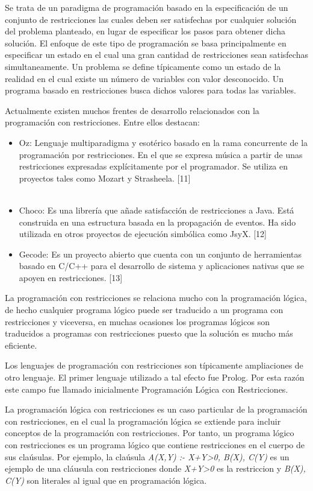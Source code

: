 Se trata de un paradigma de programaci\'on basado en la especificaci\'on de un conjunto de restricciones las cuales deben ser satisfechas por cualquier soluci\'on del problema planteado, en lugar de especificar los pasos para obtener dicha soluci\'on. El enfoque de este tipo de programaci\'on se basa principalmente en especificar un estado en el cual una gran cantidad de restricciones sean satisfechas simultaneamente. Un problema se define t\'ipicamente como un estado de la realidad	en el cual existe un n\'umero de variables con valor desconocido. Un programa basado en restricciones busca dichos valores para todas las variables.

Actualmente existen muchos frentes de desarrollo relacionados con la programaci\'on con restricciones. Entre ellos destacan:
\begin{itemize}
\item Oz: Lenguaje multiparadigma y esot\'erico basado en la rama concurrente de la programaci\'on por restricciones. En el que se expresa m\'usica a partir de unas restricciones expresadas expl\'icitamente por el programador. Se utiliza en proyectos tales como Mozart y Strasheela. [11] \\\\
\item Choco: Es una librer\'ia que a\~nade satisfacci\'on de restricciones a Java. Est\'a construida en una estructura basada en la propagaci\'on de eventos. Ha sido utilizada en otros proyectos de ejecuci\'on simb\'olica como JsyX. [12]
\item Gecode: Es un proyecto abierto que cuenta con un conjunto de herramientas basado en C/C++ para el desarrollo de sistema y aplicaciones nativas que se apoyen en restricciones. [13]
\end{itemize}

La programaci\'on con restricciones se relaciona mucho con la programaci\'on l\'ogica, de hecho cualquier programa l\'ogico puede ser traducido a un programa con restricciones y viceversa, en muchas ocasiones los programas l\'ogicos son traducidos a programas con restricciones puesto que la soluci\'on es mucho m\'as eficiente. 

Los lenguajes de programaci\'on con restricciones son t\'ipicamente ampliaciones de otro lenguaje. El primer lenguaje utilizado a tal efecto fue Prolog. Por esta raz\'on este campo fue llamado inicialmente Programaci\'on L\'ogica con Restricciones.

La programaci\'on l\'ogica con restricciones es un caso particular de la programaci\'on con restricciones, en el cual la programaci\'on l\'ogica se extiende para incluir conceptos de la programaci\'on con restricciones. Por tanto, un programa l\'ogico con restricciones es un programa l\'ogico que contiene restricciones en el cuerpo de sus cla\'usulas. Por ejemplo, la cla\'usula {\it A(X,Y) :- X+Y>0, B(X), C(Y)} es un ejemplo de una cl\'ausula con restricciones donde {\it X+Y>0} es la restriccion y {\it B(X), C(Y)} son literales al igual que en programaci\'on l\'ogica.

